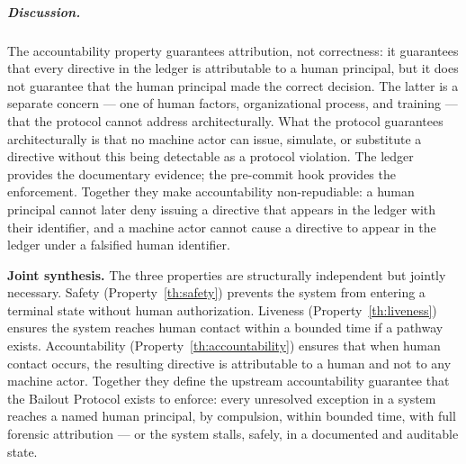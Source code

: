 \subparagraph{Discussion.} The accountability property guarantees attribution, not correctness: it guarantees that every directive in the ledger is attributable to a human principal, but it does not guarantee that the human principal made the correct decision. The latter is a separate concern --- one of human factors, organizational process, and training --- that the protocol cannot address architecturally. What the protocol guarantees architecturally is that no machine actor can issue, simulate, or substitute a directive without this being detectable as a protocol violation. The ledger provides the documentary evidence; the pre-commit hook provides the enforcement. Together they make accountability non-repudiable: a human principal cannot later deny issuing a directive that appears in the ledger with their identifier, and a machine actor cannot cause a directive to appear in the ledger under a falsified human identifier.

\medskip\noindent\textbf{Joint synthesis.} The three properties are structurally independent but jointly necessary. Safety (Property~\ref{th:safety}) prevents the system from entering a terminal state without human authorization. Liveness (Property~\ref{th:liveness}) ensures the system reaches human contact within a bounded time if a pathway exists. Accountability (Property~\ref{th:accountability}) ensures that when human contact occurs, the resulting directive is attributable to a human and not to any machine actor. Together they define the upstream accountability guarantee that the Bailout Protocol exists to enforce: every unresolved exception in a \bxthree{} system reaches a named human principal, by compulsion, within bounded time, with full forensic attribution --- or the system stalls, safely, in a documented and auditable state.
